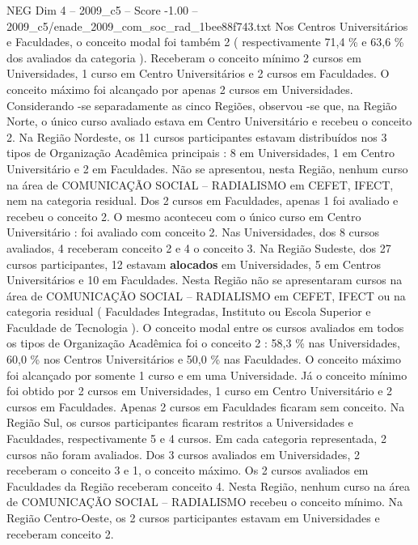 \begin{textsample}{NEG Dim 4 – 2009\_c5 – Score -1.00 – 2009\_c5/enade\_2009\_com\_soc\_rad\_1bee88f743.txt}
Nos Centros Universitários e Faculdades, o conceito modal foi também 2 ( respectivamente 71,4 \% e 63,6 \% dos avaliados da categoria ).
Receberam o conceito mínimo 2 cursos em Universidades, 1 curso em Centro Universitários e 2 cursos em Faculdades.
O conceito máximo foi alcançado por apenas 2 cursos em Universidades.
Considerando -se separadamente as cinco Regiões, observou -se que, na Região Norte, o único curso avaliado estava em Centro Universitário e recebeu o conceito 2.
Na Região Nordeste, os 11 cursos participantes estavam distribuídos nos 3 tipos de Organização Acadêmica principais : 8 em Universidades, 1 em Centro Universitário e 2 em Faculdades.
Não se apresentou, nesta Região, nenhum curso na área de COMUNICAÇÃO SOCIAL – RADIALISMO em CEFET, IFECT, nem na categoria residual.
Dos 2 cursos em Faculdades, apenas 1 foi avaliado e recebeu o conceito 2.
O mesmo aconteceu com o único curso em Centro Universitário : foi avaliado com conceito 2.
Nas Universidades, dos 8 cursos avaliados, 4 receberam conceito 2 e 4 o conceito 3.
Na Região Sudeste, dos 27 cursos participantes, 12 estavam \textbf{alocados} em Universidades, 5 em Centros Universitários e 10 em Faculdades.
Nesta Região não se apresentaram cursos na área de COMUNICAÇÃO SOCIAL – RADIALISMO em CEFET, IFECT ou na categoria residual ( Faculdades Integradas, Instituto ou Escola Superior e Faculdade de Tecnologia ).
O conceito modal entre os cursos avaliados em todos os tipos de Organização Acadêmica foi o conceito 2 : 58,3 \% nas Universidades, 60,0 \% nos Centros Universitários e 50,0 \% nas Faculdades.
O conceito máximo foi alcançado por somente 1 curso e em uma Universidade.
Já o conceito mínimo foi obtido por 2 cursos em Universidades, 1 curso em Centro Universitário e 2 cursos em Faculdades.
Apenas 2 cursos em Faculdades ficaram sem conceito.
Na Região Sul, os cursos participantes ficaram restritos a Universidades e Faculdades, respectivamente 5 e 4 cursos.
Em cada categoria representada, 2 cursos não foram avaliados.
Dos 3 cursos avaliados em Universidades, 2 receberam o conceito 3 e 1, o conceito máximo.
Os 2 cursos avaliados em Faculdades da Região receberam conceito 4.
Nesta Região, nenhum curso na área de COMUNICAÇÃO SOCIAL – RADIALISMO recebeu o conceito mínimo.
Na Região Centro-Oeste, os 2 cursos participantes estavam em Universidades e receberam conceito 2.

\end{textsample}
